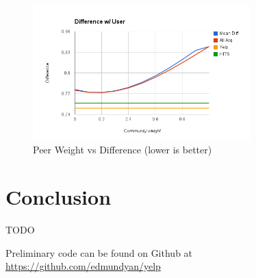 \documentclass[10pt]{article}
\begin{document}
\begin{figure}[ht]
  \centering
    \includegraphics[width=0.75\textwidth]{temp_results.png}
  \caption{Peer Weight vs Difference (lower is better)}
  \label{fig:social_degree}
\end{figure}


\section{Conclusion}
\label{sec:conclusion}
TODO


Preliminary code can be found on Github at \url{https://github.com/edmundyan/yelp}

\printbibliography
\end{document}
